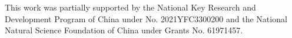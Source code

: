 \documentclass[sigconf]{acmart}
\begin{document}

\maketitle

  

  
  
  

  

  

\begin{acks}
  This work was partially supported by the National Key Research and Development Program of China under No. 2021YFC3300200 and the National Natural Science Foundation of China under Grants No. 61971457.
\end{acks}


{\balance }



\appendix


\end{document}
